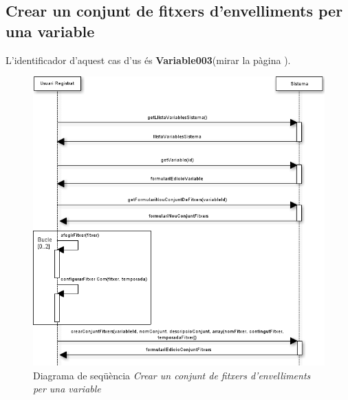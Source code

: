 \subsection*{Crear un conjunt de fitxers d'envelliments per una variable}
L'identificador d'aquest cas d'us \'{e}s \textbf{Variable003}(mirar la p\`{a}gina \pageref{variable003}).
\begin{figure}[H]
  \centering
  \includegraphics[scale=0.6]{img/specification/SequenceNewSeasonSe.png}
  \caption{Diagrama de seqüència \textit{Crear un conjunt de fitxers d'envelliments per una variable}}
  \label{fig:sequencenewseasonset}
\end{figure}

